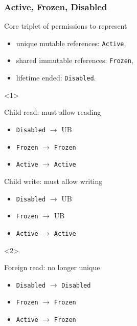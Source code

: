 \begin{frame}[t]
    \frametitle{Active, Frozen, Disabled}
    Core triplet of permissions to represent
    \begin{itemize}
        \item unique mutable references: \texttt{Active},
        \item shared immutable references: \texttt{Frozen},
        \item lifetime ended: \texttt{Disabled}.
    \end{itemize}

    \begin{onlyenv}<1>
        \begin{block}{Child read: must allow reading}
            \begin{itemize}
                \item \texttt{Disabled} \(\to\) UB
                \item \texttt{Frozen} \(\to\) \texttt{Frozen}
                \item \texttt{Active} \(\to\) \texttt{Active}
            \end{itemize}
        \end{block}

        \begin{block}{Child write: must allow writing}
            \begin{itemize}
                \item \texttt{Disabled} \(\to\) UB
                \item \texttt{Frozen} \(\to\) UB
                \item \texttt{Active} \(\to\) \texttt{Active}
            \end{itemize}
        \end{block}
    \end{onlyenv}

    \begin{onlyenv}<2>
        \begin{block}{Foreign read: no longer unique}
            \begin{itemize}
                \item \texttt{Disabled} \(\to\) \texttt{Disabled}
                \item \texttt{Frozen} \(\to\) \texttt{Frozen}
                \item \texttt{Active} \(\to\) \texttt{Frozen}
            \end{itemize}
        \end{block}


\end{onlyenv}
\end{frame}
